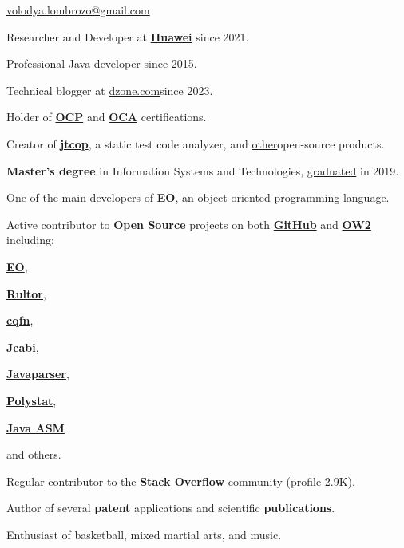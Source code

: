 \documentclass{vl}
\begin{document}
    \sffamily

    \vlPrintPhoto{}

    {\scshape\bfseries\Large {}}\newline
    \href{mailto:volodya.lombrozo@gmail.com}{volodya.lombrozo@gmail.com}

    \vspace{1em}

    Researcher and Developer at \textbf{\href{https://www.huawei.com}{Huawei}} since 2021.

    Professional Java developer since 2015.

    Technical blogger at \href{https://dzone.com/users/4993224/volodya-lombrozo.html}{dzone.com}since 2023.

    Holder of
    \textbf{\href{https://catalog-education.oracle.com/pls/certview/sharebadge?id=87F6A2FE819A5A5AF4120A05900AB28A461EE9A3EE9FBFA02721FADAEB3BCE19}{OCP}}
    and
    \textbf{\href{https://www.credly.com/badges/e2d9ddda-20dc-433d-8ab7-18548fd0fd8f/public_url}{OCA}} certifications.

    Creator of \textbf{\href{https://github.com/volodya-lombrozo/jtcop}{jtcop}}, a static test code analyzer,
    and \href{https://github.com/volodya-lombrozo?tab=repositories}{other}open-source products.

    \textbf{Master's degree} in Information Systems and Technologies,
    \href{https://en.wikipedia.org/wiki/Saint_Petersburg_Electrotechnical_University}{graduated} in 2019.

    One of the main developers of \textbf{\href{https://www.eolang.org}{EO}}, an object-oriented programming language.

    Active contributor to \textbf{Open Source} projects on both \textbf{\href{https://github.com/volodya-lombrozo}{GitHub}}
    and \textbf{\href{https://gitlab.ow2.org/lombrozo}{OW2}} including:
    \begin{inparaenum}[1)]
        \item \textbf{\href{https://www.eolang.org}{EO}},
        \item \textbf{\href{https://github.com/yegor256/rultor}{Rultor}},
        \item \textbf{\href{https://github.com/cqfn}{cqfn}},
        \item \textbf{\href{https://github.com/jcabi}{Jcabi}},
        \item \textbf{\href{https://github.com/javaparser/javaparser}{Javaparser}},
        \item \textbf{\href{https://github.com/polystat}{Polystat}},
        \item \textbf{\href{https://gitlab.ow2.org/asm/asm}{Java ASM}}
        \item and others.
    \end{inparaenum}

    Regular contributor to the \textbf{Stack Overflow} community
    (\href{https://stackoverflow.com/users/10423604/volodya-lombrozo}{profile 2.9K}).

    Author of several \textbf{patent} applications and scientific \textbf{publications}.

    Enthusiast of basketball, mixed martial arts, and music.
\end{document}
